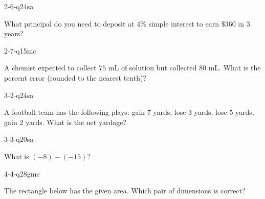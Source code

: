 \begin{practiceQuestion}{2-6-q24}{sa}
\begin{questionText}
What principal do you need to deposit at $4\%$ simple interest to earn $\$360$ in $3$ years?
\end{questionText}
\end{practiceQuestion}

\begin{practiceQuestion}{2-7-q15}{mc}
\begin{questionText}
A chemist expected to collect $75$ mL of solution but collected $80$ mL. What is the percent error (rounded to the nearest tenth)?
\end{questionText}
\end{practiceQuestion}

\begin{practiceQuestion}{3-2-q24}{sa}
\begin{questionText}
A football team has the following plays: gain $7$ yards, lose $3$ yards, lose $5$ yards, gain $2$ yards. What is the net yardage?
\end{questionText}
\end{practiceQuestion}

\begin{practiceQuestion}{3-3-q20}{sa}
\begin{questionText}
What is $(-8) - (-15)$?
\end{questionText}
\end{practiceQuestion}

\begin{practiceQuestion}{4-4-q28}{gmc}
\begin{questionText}
The rectangle below has the given area. Which pair of dimensions is correct?

\begin{center}
\end{center}
\end{questionText}
\end{practiceQuestion}

